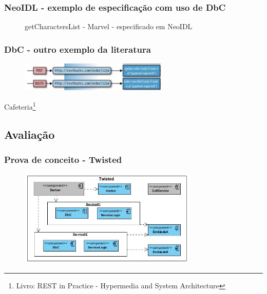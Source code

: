 \documentclass{beamer}
\begin{document}
\begin{frame}
\frametitle{NeoIDL - exemplo de especificação com uso de DbC}

\begin{figure}[htb]
\begin{tiny}

\end{tiny}

getCharactersList - Marvel - especificado em NeoIDL

\label{lst:getCharacters-neo}
\end{figure}

\end{frame}

\begin{frame}
\frametitle{DbC - outro exemplo da literatura}

\begin{figure}[h]
\includegraphics[width=7cm]{LojaCafeTrecho.jpg}
\end{figure}
\begin{center}
Cafeteria\footnote{Livro: REST in Practice - Hypermedia and System Architecture}
\end{center}
\vspace{-1cm}

\begin{figure}[htb]
\begin{tiny}

\end{tiny}


\label{lst:getCharacters-neo}
\end{figure}


\end{frame}

\subsection[Avaliação]{Avaliação} 

\begin{frame}
\frametitle{Prova de conceito - Twisted	}


\begin{figure}[h]
\includegraphics[width=8.5cm]{DigramaComponentesTwisted.jpg}
\end{figure}


\end{frame}
\end{document}
